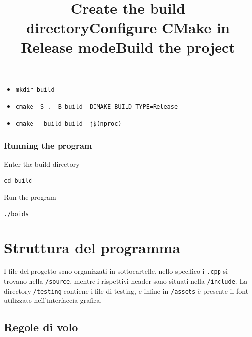 \documentclass[10pt,a4paper]{article}
\begin{document}
\begin{itemize}
    \item \title{\textbf{Create the build directory}}

          \begin{lstlisting}[style=github-bash]
mkdir build
\end{lstlisting}

    \item \title{\textbf{Configure CMake in Release mode}}

          \begin{lstlisting}[style=github-bash]
cmake -S . -B build -DCMAKE_BUILD_TYPE=Release
\end{lstlisting}

    \item \title{\textbf{Build the project}}

          \begin{lstlisting}[style=github-bash]
cmake --build build -j$(nproc)
\end{lstlisting}
\end{itemize}


\subsubsection{Running the program}

Enter the build directory
\begin{lstlisting}[style=github-bash]
cd build
\end{lstlisting}

Run the program
\begin{lstlisting}[style=github-bash]
./boids
\end{lstlisting}


\newpage

\parskip 6.4pt

\section{Struttura del programma}

I file del progetto sono organizzati in sottocartelle, nello specifico i \texttt{.cpp} si trovano nella \texttt{/source}, mentre i rispettivi header sono situati nella \texttt{/include}. La directory \texttt{/testing} contiene i file di testing, e infine in \texttt{/assets} è presente il font utilizzato nell'interfaccia grafica.

\subsection{Regole di volo}
\end{document}
